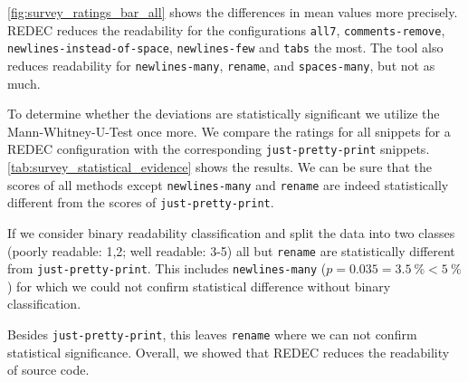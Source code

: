 \documentclass[%
class=scrreprt,
chapterprefix=false,%
open=right,%
twoside=true,%
paper=a4,%
logofile={Logo\_zentral\_farbig\_EN.png},%
thesistype=master,%
UKenglish,%
]{se2thesis}
\theoremstyle{definition}
\newcommand{\rdh}{REDEC\xspace}
\newcommand{\none}{just-pretty-print\xspace} %
\newcommand{\nonet}{\texttt{\none}\xspace} %
\begin{document}
	\begin{sloppypar}
	\autoref{fig:survey_ratings_bar_all} shows the differences in mean values more precisely. \rdh reduces the readability for the configurations \texttt{all7}, \texttt{comments-remove}, \texttt{newlines-instead-of-space}, \texttt{newlines-few} and \texttt{tabs} the most. The tool also reduces readability for \texttt{newlines-many}, \texttt{rename}, and \texttt{spaces-many}, but not as much. 
	\end{sloppypar}
	To determine whether the deviations are statistically significant we utilize the Mann-Whitney-U-Test once more. We compare the ratings for all snippets for a \rdh configuration with the corresponding \nonet snippets. \autoref{tab:survey_statistical_evidence} shows the results.
	We can be sure that the scores of all methods except \texttt{newlines-many} and \texttt{rename} are indeed statistically different from the scores of \nonet. 
	
	If we consider binary readability classification and split the data into two classes (poorly readable: 1,2; well readable: 3-5) all but \texttt{rename} are statistically different from \nonet. This includes \texttt{newlines-many} ($p=0.035=3.5~\% < 5~\%$) for which we could not confirm statistical difference without binary classification.

	Besides \nonet, this leaves \texttt{rename} where we can not confirm statistical significance. Overall, we showed that \rdh reduces the readability of source code.
\end{document}
